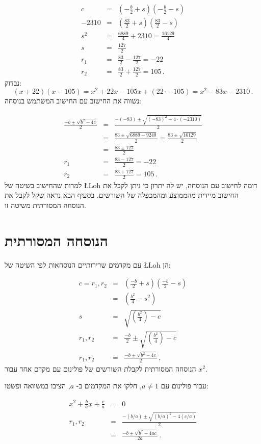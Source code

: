 \begin{eqnarray*}
c&=&\left(-\frac{b}{2} +s\right)\left(-\frac{b}{2} -s\right)\\
-2310&=&\left(\frac{83}{2}+s\right)\left(\frac{83}{2} -s\right)\\
s^2&=&\frac{6889}{4}+2310=\frac{16129}{4}\\
s&=&\frac{127}{2}\\
r_1&=&\frac{83}{2}-\frac{127}{2}=-22\\
r_2&=&\frac{83}{2}+\frac{127}{2}=105\,.
\end{eqnarray*}
נבדוק:
\[
(x+22)(x-105)=x^2+22x-105x+(22\cdot -105)= x^2-83x-2310\,.
\]
נשווה את החישוב עם החישוב המשתמש בנוסחה:

\begin{eqnarray*}
\frac{-b\pm\sqrt{b^2-4c}}{2}&=&\frac{-(-83)\pm\sqrt{(-83)^2-4\cdot (-2310)}}{2}\\
&=& \frac{83\pm\sqrt{6889+9240}}{2} = \frac{83\pm\sqrt{16129}}{2}\\
&=& \frac{83\pm 127}{2}\\
r_1&=&\frac{83-127}{2}=-22\\
r_2&=&\frac{83+127}{2}=105\,.
\end{eqnarray*}
למרות שהחישוב בשיטה של
\L{Loh}
דומה לחישוב עם הנוסחה, יש לה יתרון כי ניתן לקבל את החישוב מיידית מהממוצע ומהמכפלה של השורשים. בסעיף הבא נראה שקל לקבל את הנוסחה המסורתית משיטה זו.


\section{הנוסחה המסורתית}\label{s.general}

עם מקדמים שרירותיים הנוסחאות לפי השיטה של
\L{Loh}
הן:

\begin{eqnarray*}
c=r_1,r_2&=&\left(\frac{-b}{2}+s\right)  \left(\frac{-b}{2}-s\right)\\
&=&\left(\frac{b^2}{4}-s^2\right)\\
s&=&\sqrt{\left(\frac{b^2}{4}\right)-c}\\
r_1,r_2&=&\frac{-b}{2}\pm\sqrt{\left(\frac{b^2}{4}\right)-c}\\
r_1,r_2&=&\frac{-b\pm\sqrt{b^2-4c}}{2}\,,
\end{eqnarray*}
הנוסחה המסורתית לקבלת השורשים של פולינום עם מקדם אחד עבור
$x^2$.

עבור פולינום עם
$a\neq 1$, 
חלקו את המקדמים ב-%
$a$,
הציבו במשוואה ופשטו:

\begin{eqnarray*}
x^2+\frac{b}{a}x+\frac{c}{a}&=&0\\
r_1,r_2&=&\frac{-(b/a)\pm\sqrt{(b/a)^2-4(c/a)}}{2}\\
&=&\frac{-b\pm\sqrt{b^2-4ac}}{2a}\,.
\end{eqnarray*}


